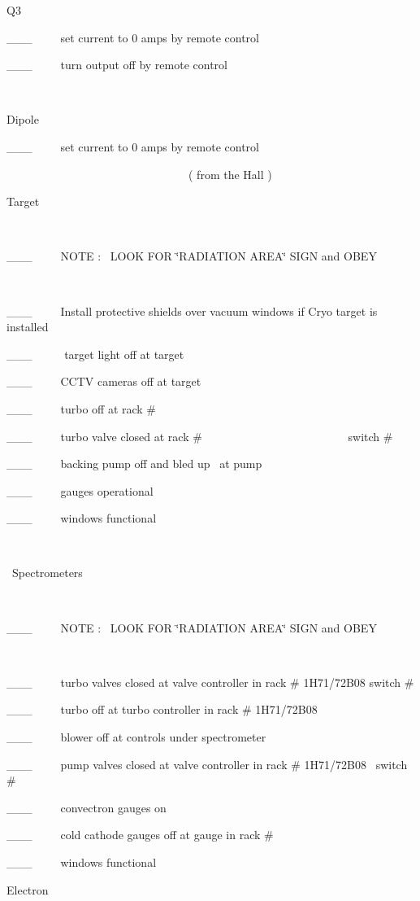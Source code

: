 Q3

\_\_\_~~~~~set current to 0 amps by remote control 

\_\_\_~~~~~turn output off by remote control 

~

Dipole

\_\_\_~~~~~set current to 0 amps by remote control 
~

~~~~~~~~~~~~~~~~~~~~~~~~~~~~~~~~( from the Hall )

Target

~

\_\_\_~~~~~NOTE :~ LOOK FOR \char`\"{}RADIATION AREA\char`\"{} SIGN and OBEY

~

\_\_\_~~~~~Install protective shields over vacuum windows if Cryo target is
installed

\_\_\_~~~~~ target light off at target

\_\_\_~~~~~CCTV cameras off at target

\_\_\_~~~~~turbo off at rack \#

\_\_\_~~~~~turbo valve closed at rack \#~~~~~~~~~~~~~~~~~~~~~~~~~ switch \#

\_\_\_~~~~~backing pump off and bled up~ at pump

\_\_\_~~~~~gauges operational

\_\_\_~~~~~windows functional

~


~Spectrometers

~

\_\_\_~~~~~NOTE :~ LOOK FOR \char`\"{}RADIATION AREA\char`\"{} SIGN and OBEY

~

\_\_\_~~~~~turbo valves closed at valve controller in rack \# 1H71/72B08 switch
\#

\_\_\_~~~~~turbo off at turbo controller in rack \# 1H71/72B08

\_\_\_~~~~~blower off at controls under spectrometer

\_\_\_~~~~~pump valves closed at valve controller in rack \# 1H71/72B08~ switch
\# 

\_\_\_~~~~~convectron gauges on

\_\_\_~~~~~cold cathode gauges off at gauge in rack \#

\_\_\_~~~~~windows functional


Electron

